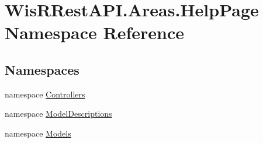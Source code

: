 \hypertarget{namespace_wis_r_rest_a_p_i_1_1_areas_1_1_help_page}{}\section{Wis\+R\+Rest\+A\+P\+I.\+Areas.\+Help\+Page Namespace Reference}
\label{namespace_wis_r_rest_a_p_i_1_1_areas_1_1_help_page}
\subsection*{Namespaces}
\begin{DoxyCompactItemize}
\item 
namespace \hyperlink{namespace_wis_r_rest_a_p_i_1_1_areas_1_1_help_page_1_1_controllers}{Controllers}
\item 
namespace \hyperlink{namespace_wis_r_rest_a_p_i_1_1_areas_1_1_help_page_1_1_model_descriptions}{Model\+Descriptions}
\item 
namespace \hyperlink{namespace_wis_r_rest_a_p_i_1_1_areas_1_1_help_page_1_1_models}{Models}
\end{DoxyCompactItemize}
